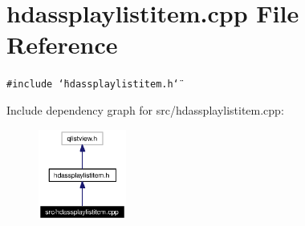 \section{hdassplaylistitem.cpp File Reference}
\label{src_2hdassplaylistitem_8cpp}


{\tt \#include \char`\"{}hdassplaylistitem.h\char`\"{}}\par


Include dependency graph for src/hdassplaylistitem.cpp:\begin{figure}[H]
\begin{center}
\leavevmode
\includegraphics[width=82pt]{src_2hdassplaylistitem_8cpp__incl}
\end{center}
\end{figure}
